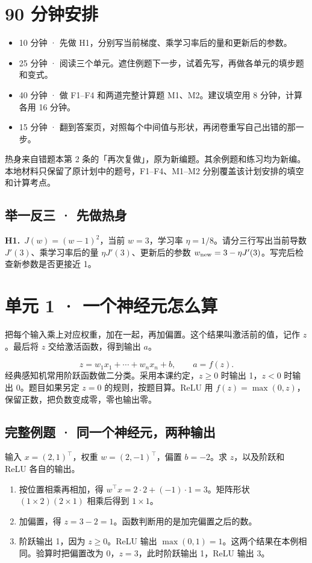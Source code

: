\documentclass[UTF8,a4paper,11pt]{ctexart}
\newcommand{\PracticeQuestion}[3]{\par\Needspace{4\baselineskip}\noindent\begin{minipage}{\linewidth}\textbf{#1.}\ #2\par\noindent\rule{0pt}{#3mm}\par\end{minipage}\par}
\begin{document}
\section{90 分钟安排}
\begin{itemize}
\item 10 分钟 · 先做 H1，分别写当前梯度、乘学习率后的量和更新后的参数。
\item 25 分钟 · 阅读三个单元。遮住例题下一步，试着先写，再做各单元的填步题和变式。
\item 40 分钟 · 做 F1–F4 和两道完整计算题 M1、M2。建议填空用 8 分钟，计算各用 16 分钟。
\item 15 分钟 · 翻到答案页，对照每个中间值与形状，再闭卷重写自己出错的那一步。
\end{itemize}
热身来自错题本第 2 条的「再次复做」，原为新编题。其余例题和练习均为新编。本地材料只保留了原计划中的题号，F1–F4、M1–M2 分别覆盖该计划安排的填空和计算考点。

\subsection{举一反三 · 先做热身}
\PracticeQuestion{H1}{$J(w)=(w-1)^2$，当前 $w=3$，学习率 $\eta=1/8$。请分三行写出当前导数 $J'(3)$、乘学习率后的量 $\eta J'(3)$、更新后的参数 $w_{\rm new}=3-\eta J'(3)$。写完后检查新参数是否更接近 1。}{35}
\clearpage
\section{单元 1 · 一个神经元怎么算}
把每个输入乘上对应权重，加在一起，再加偏置。这个结果叫激活前的值，记作 $z$。最后将 $z$ 交给激活函数，得到输出 $a$。

\[z=w_1x_1+\cdots+w_nx_n+b,\qquad a=f(z).\]
经典感知机常用阶跃函数做二分类。采用本课约定，$z\ge 0$ 时输出 1，$z<0$ 时输出 0。题目如果另定 $z=0$ 的规则，按题目算。ReLU 用 $f(z)=\max(0,z)$，保留正数，把负数变成零，零也输出零。

\subsection{完整例题 · 同一个神经元，两种输出}
输入 $x=(2,1)^\top$，权重 $w=(2,-1)^\top$，偏置 $b=-2$。求 $z$，以及阶跃和 ReLU 各自的输出。

\begin{enumerate}
\item 按位置相乘再相加，得 $w^\top x=2\cdot2+(-1)\cdot1=3$。矩阵形状 $(1\times2)(2\times1)$ 相乘后得到 $1\times1$。
\item 加偏置，得 $z=3-2=1$。函数判断用的是加完偏置之后的数。
\item 阶跃输出 1，因为 $z\ge0$。ReLU 输出 $\max(0,1)=1$。这两个结果在本例相同。验算时把偏置改为 $0$，$z=3$，此时阶跃输出 1，ReLU 输出 3。
\end{enumerate}
\end{document}
